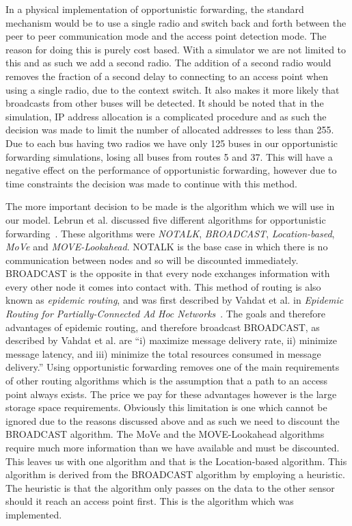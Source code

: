 
        In a physical implementation of opportunistic forwarding, the standard mechanism would be to use a single radio and switch back and forth between the peer to peer communication mode and the access point detection mode. The reason for doing this is purely cost based. With a simulator we are not limited to this and as such we add a second radio. The addition of a second radio would removes the fraction of a second delay to connecting to an access point when using a single radio, due to the context switch. It also makes it more likely that broadcasts from other buses will be detected. It should be noted that in the simulation, IP address allocation is a complicated procedure and as such the decision was made to limit the number of allocated addresses to less than 255. Due to each bus having two radios we have only 125 buses in our opportunistic forwarding simulations, losing all buses from routes 5 and 37. This will have a negative effect on the performance of opportunistic forwarding, however due to time constraints the decision was made to continue with this method.

        The more important decision to be made is the algorithm which we will use in our model. Lebrun et al. discussed five different algorithms for opportunistic forwarding~\cite{opportunisticforwarding}. These algorithms were \emph{NOTALK}, \emph{BROADCAST}, \emph{Location-based}, \emph{MoVe} and \emph{MOVE-Lookahead}. NOTALK is the base case in which there is no communication between nodes and so will be discounted immediately. BROADCAST is the opposite in that every node exchanges information with every other node it comes into contact with. This method of routing is also known as \emph{epidemic routing}, and was first described by Vahdat et al. in \emph{Epidemic Routing for Partially-Connected Ad Hoc Networks}~\cite{vahdat2000epidemic}. The goals and therefore advantages of epidemic routing, and therefore broadcast BROADCAST, as described by Vahdat et al. are ``i) maximize message delivery rate, ii) minimize message latency, and iii) minimize the total resources consumed in message delivery.'' Using opportunistic forwarding removes one of the main requirements of other routing algorithms which is the assumption that a path to an access point always exists. The price we pay for these advantages however is the large storage space requirements. Obviously this limitation is one which cannot be ignored due to the reasons discussed above and as such we need to discount the BROADCAST algorithm. The MoVe and the MOVE-Lookahead algorithms require much more information than we have available and must be discounted. This leaves us with one algorithm and that is the Location-based algorithm. This algorithm is derived from the BROADCAST algorithm by employing a heuristic. The heuristic is that the algorithm only passes on the data to the other sensor should it reach an access point first. This is the algorithm which was implemented. 

